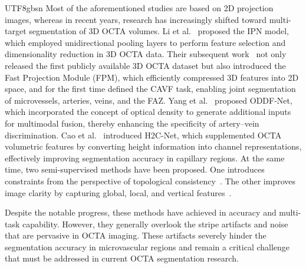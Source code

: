 \documentclass[times, review, 10pt]{elsarticle}
\begin{document}
\begin{CJK}{UTF8}{gbsn}
Most of the aforementioned studies are based on 2D projection images, whereas in recent years, research has increasingly shifted toward multi-target segmentation of 3D OCTA volumes. Li et al.~\cite{ref10} proposed the IPN model, which employed unidirectional pooling layers to perform feature selection and dimensionality reduction in 3D OCTA data. Their subsequent work~\cite{ref5} not only released the first publicly available 3D OCTA dataset but also introduced the Fast Projection Module (FPM), which efficiently compressed 3D features into 2D space, and for the first time defined the CAVF task, enabling joint segmentation of microvessels, arteries, veins, and the FAZ. Yang et al.~\cite{ref12} proposed ODDF-Net, which incorporated the concept of optical density to generate additional inputs for multimodal fusion, thereby enhancing the specificity of artery–vein discrimination. Cao et al.~\cite{ref13} introduced H2C-Net, which supplemented OCTA volumetric features by converting height information into channel representations, effectively improving segmentation accuracy in capillary regions. At the same time, two semi-supervised methods have been proposed. One introduces constraints from the perspective of topological consistency~\cite{ref53}. The other improves image clarity by capturing global, local, and vertical features~\cite{ref54}.
\par
Despite the notable progress, these methods have achieved in accuracy and multi-task capability. However, they generally overlook the stripe artifacts and noise that are pervasive in OCTA imaging. These artifacts severely hinder the segmentation accuracy in microvascular regions and remain a critical challenge that must be addressed in current OCTA segmentation research.


\end{CJK}
\end{document}
